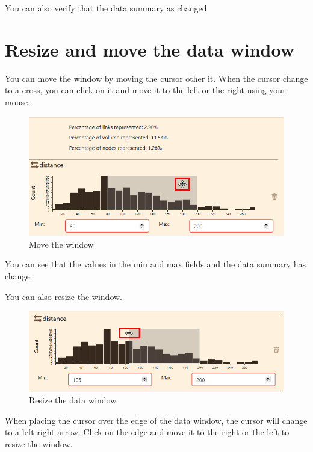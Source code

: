 \documentclass[]{book}
\begin{document}
You can also verify that the data summary as changed

\hypertarget{resize-and-move-the-data-window}{%
\section{Resize and move the data window}\label{resize-and-move-the-data-window}}

You can move the window by moving the cursor other it.
When the cursor change to a cross, you can click on it and move it to the left or the right using your mouse.

\begin{figure}
\centering
\includegraphics{images/functions/data_panel/05_data_panel_filter_move_window.png}
\caption{Move the window}
\end{figure}

You can see that the values in the min and max fields and the data summary has change.

You can also resize the window.

\begin{figure}
\centering
\includegraphics{images/functions/data_panel/06_data_panel_filter_resize_window.png}
\caption{Resize the data window}
\end{figure}

When placing the cursor over the edge of the data window, the cursor will change to a left-right arrow.
Click on the edge and move it to the right or the left to resize the window.
\end{document}
